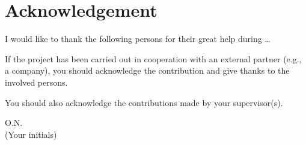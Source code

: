 \section*{Acknowledgement}
I would like to thank the following persons for their great help during \ldots

If the project has been carried out in cooperation with an external partner (e.g., a company), you should acknowledge the contribution and give thanks to the involved persons.

You should also acknowledge the contributions made by your supervisor(s).

\begin{flushright}
O.N.\\[1pc]
(Your initials)
\end{flushright}